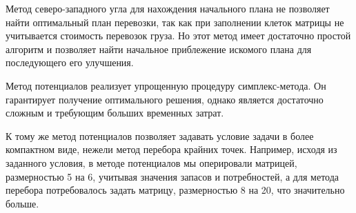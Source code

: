 \documentclass[../body.tex]{subfiles}
\begin{document}
Метод северо-западного угла для нахождения начального плана не позволяет найти оптимальный план перевозки, так как при заполнении клеток матрицы не учитывается стоимость перевозок груза. Но этот метод имеет достаточно простой алгоритм и позволяет найти начальное приблежение искомого плана для последующего его улучшения.

Метод потенциалов реализует упрощенную процедуру симплекс-метода. Он гарантирует получение оптимального решения, однако является достаточно сложным и требующим больших временных затрат.

К тому же метод потенциалов позволяет задавать условие задачи в более компактном виде, нежели метод перебора крайних точек. Например, исходя из заданного условия, в методе потенциалов мы оперировали матрицей, размерностью 5 на 6, учитывая значения запасов и потребностей, а для метода перебора потребовалось задать матрицу, размерностью 8 на 20, что значительно больше.
\end{document}
